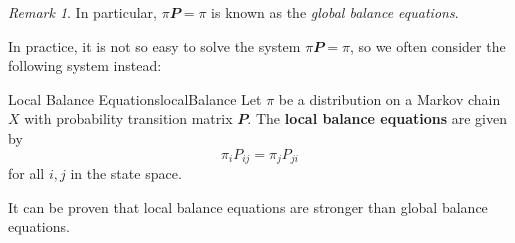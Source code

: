 \documentclass[math, code]{amznotes}
\theoremstyle{remark}
\newtheorem*{remark}{Remark}
\begin{document}
\begin{notebox}
    \begin{remark}
        In particular, $\pi\mathbfit{P} = \pi$ is known as the \textit{global balance equations}.
    \end{remark}
\end{notebox}
In practice, it is not so easy to solve the system $\pi\mathbfit{P} = \pi$, so we often consider the following system instead:
\begin{dfnbox}{Local Balance Equations}{localBalance}
    Let $\pi$ be a distribution on a Markov chain $X$ with probability transition matrix $\mathbfit{P}$. The {\color{red} \textbf{local balance equations}} are given by 
    \begin{equation*}
        \pi_iP_{ij} = \pi_jP_{ji}
    \end{equation*}
    for all $i, j$ in the state space.
\end{dfnbox}
It can be proven that local balance equations are stronger than global balance equations.
\end{document}
